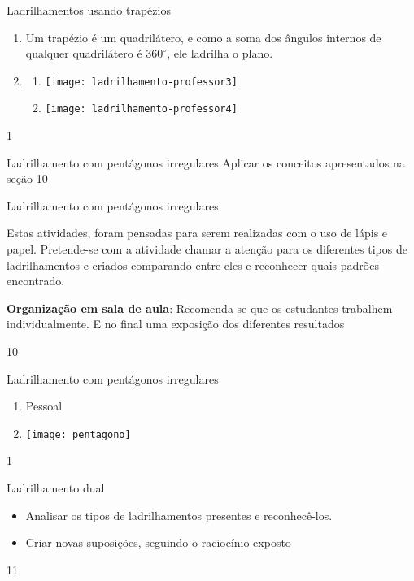 \begin{answer}{Ladrilhamentos usando trapézios}
{
	\begin{enumerate}
	\item Um trapézio é um quadrilátero, e como a soma dos ângulos internos de qualquer quadrilátero é $360^{\circ}$, ele ladrilha o plano.
	\item
	\begin{enumerate}
	\item 
	{
	\texttt{[image: ladrilhamento-professor3]}
	}

	\item
	{	
	\texttt{[image: ladrilhamento-professor4]}
	}
	\end{enumerate}
	\end{enumerate}
}{1}
\end{answer}
\clearmargin
\begin{objectives}{Ladrilhamento com pentágonos irregulares}
{
	Aplicar os conceitos apresentados na seção
}{1}{0}
\end{objectives}
\begin{sugestions}{Ladrilhamento com pentágonos irregulares}
{
	Estas atividades, foram pensadas para serem realizadas com o uso de lápis e papel. Pretende-se com a atividade chamar a atenção para os diferentes tipos de ladrilhamentos e criados comparando entre eles e reconhecer quais padrões encontrado. 

	\textbf{Organização em sala de aula}: Recomenda-se que os estudantes trabalhem individualmente. E no final uma exposição dos diferentes resultados

}{1}{0}
\end{sugestions}
\begin{answer}{Ladrilhamento com pentágonos irregulares}
{
\begin{enumerate}
\item Pessoal
\item {}
{
\texttt{[image: pentagono]}
}
\end{enumerate}
}
{1}
\end{answer}
\clearmargin
\begin{objectives}{Ladrilhamento dual}
{
	\begin{itemize}
	\item Analisar os tipos de ladrilhamentos presentes e reconhecê-los.
	\item Criar novas suposições, seguindo o raciocínio exposto
	\end{itemize}
}{1}{1}
\end{objectives}
